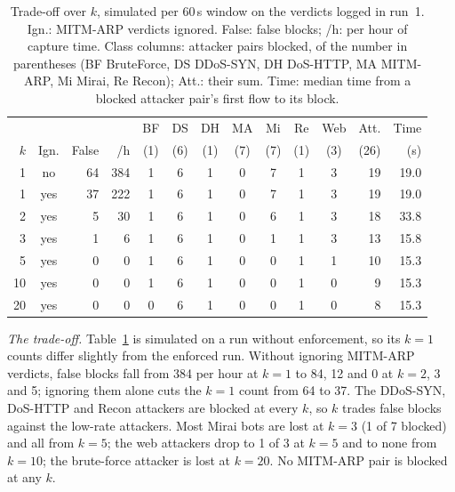 \begin{table}[t]
\centering
\caption{Trade-off over $k$, simulated per 60\,s window on the verdicts logged in run~1. Ign.: MITM-ARP verdicts ignored. False: false blocks; /h: per hour of capture time. Class columns: attacker pairs blocked, of the number in parentheses (BF BruteForce, DS DDoS-SYN, DH DoS-HTTP, MA MITM-ARP, Mi Mirai, Re Recon); Att.: their sum. Time: median time from a blocked attacker pair's first flow to its block.}
\label{tab:kcurve}
\footnotesize
\setlength{\tabcolsep}{2.4pt}
\begin{tabular}{rcrrcccccccrr}
\hline
 & & & & BF & DS & DH & MA & Mi & Re & Web & Att. & Time \\
$k$ & Ign. & False & /h & (1) & (6) & (1) & (7) & (7) & (1) & (3) & (26) & (s) \\
\hline
1  & no  & 64 & 384 & 1 & 6 & 1 & 0 & 7 & 1 & 3 & 19 & 19.0 \\
1  & yes & 37 & 222 & 1 & 6 & 1 & 0 & 7 & 1 & 3 & 19 & 19.0 \\
2  & yes &  5 &  30 & 1 & 6 & 1 & 0 & 6 & 1 & 3 & 18 & 33.8 \\
3  & yes &  1 &   6 & 1 & 6 & 1 & 0 & 1 & 1 & 3 & 13 & 15.8 \\
5  & yes &  0 &   0 & 1 & 6 & 1 & 0 & 0 & 1 & 1 & 10 & 15.3 \\
10 & yes &  0 &   0 & 1 & 6 & 1 & 0 & 0 & 1 & 0 &  9 & 15.3 \\
20 & yes &  0 &   0 & 0 & 6 & 1 & 0 & 0 & 1 & 0 &  8 & 15.3 \\
\hline
\end{tabular}
\end{table}

\emph{The trade-off.} Table~\ref{tab:kcurve} is simulated on a run without enforcement, so its $k=1$ counts differ slightly from the enforced run. Without ignoring MITM-ARP verdicts, false blocks fall from 384 per hour at $k=1$ to 84, 12 and 0 at $k=2$, 3 and 5; ignoring them alone cuts the $k=1$ count from 64 to 37. The DDoS-SYN, DoS-HTTP and Recon attackers are blocked at every $k$, so $k$ trades false blocks against the low-rate attackers. Most Mirai bots are lost at $k=3$ (1 of 7 blocked) and all from $k=5$; the web attackers drop to 1 of 3 at $k=5$ and to none from $k=10$; the brute-force attacker is lost at $k=20$. No MITM-ARP pair is blocked at any $k$.

